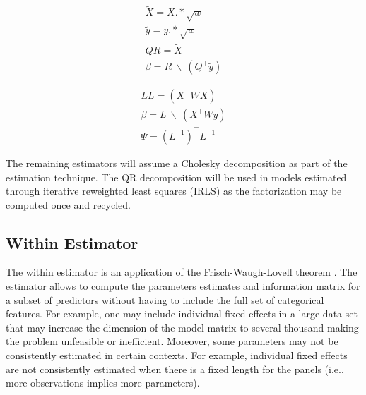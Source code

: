 \documentclass{juliacon}
\begin{document}
\begin{equation}
\label{QR}
\begin{split}
	\tilde{X} = X .* \sqrt{w} \\
	\tilde{y} = y .* \sqrt{w} \\
	QR = \tilde{X} \\
	\beta = R \ \backslash \ \left( Q^{\top} \tilde{y} \right)
\end{split}
\end{equation}

\begin{equation}
\label{Cholesky}
\begin{split}
	LL = \left( X^{\top} W X \right) \\
	\beta = L \ \backslash \ \left( X^{\top} W y \right) \\
	\Psi = \left( L^{-1}\right)^{\top} L^{-1}
\end{split}
\end{equation}

The remaining estimators will assume a Cholesky decomposition as part of the estimation technique. The QR decomposition will be used in models estimated through iterative reweighted least squares (IRLS) as the factorization may be computed once and recycled.

\subsection{Within Estimator}

The within estimator is an application of the Frisch-Waugh-Lovell theorem \cite{FWL, FWLProof}. The estimator allows to compute the parameters estimates and information matrix for a subset of predictors without having to include the full set of categorical features. For example, one may include individual fixed effects in a large data set that may increase the dimension of the model matrix to several thousand making the problem unfeasible or inefficient. Moreover, some parameters may not be consistently estimated in certain contexts. For example, individual fixed effects are not consistently estimated when there is a fixed length for the panels (i.e., more observations implies more parameters).
\end{document}
